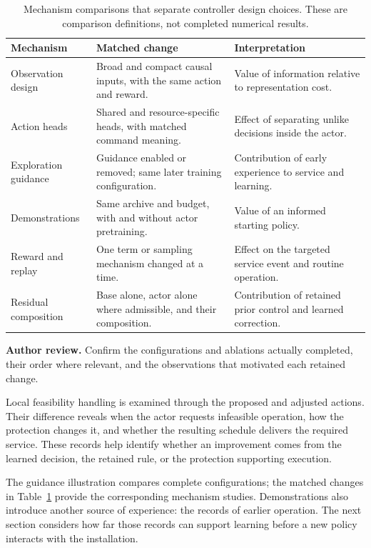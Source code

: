 \begin{table}[htbp]
\centering
\caption{Mechanism comparisons that separate controller design choices. These are comparison definitions, not completed numerical results.}
\label{tab:control-ablation-questions}
\small
\begin{tabularx}{\textwidth}{@{}p{}XX@{}}
\toprule
\textbf{Mechanism} & \textbf{Matched change} & \textbf{Interpretation}\\
\midrule
Observation design & Broad and compact causal inputs, with the same action and reward. & Value of information relative to representation cost.\\
\addlinespace
Action heads & Shared and resource-specific heads, with matched command meaning. & Effect of separating unlike decisions inside the actor.\\
\addlinespace
Exploration guidance & Guidance enabled or removed; same later training configuration. & Contribution of early experience to service and learning.\\
\addlinespace
Demonstrations & Same archive and budget, with and without actor pretraining. & Value of an informed starting policy.\\
\addlinespace
Reward and replay & One term or sampling mechanism changed at a time. & Effect on the targeted service event and routine operation.\\
\addlinespace
Residual composition & Base alone, actor alone where admissible, and their composition. & Contribution of retained prior control and learned correction.\\
\bottomrule
\end{tabularx}
\end{table}

\noindent\textcolor{orange!70!black}{\textbf{Author review.} Confirm the configurations and ablations actually completed, their order where relevant, and the observations that motivated each retained change.}

Local feasibility handling is examined through the proposed and adjusted actions. Their difference reveals when the actor requests infeasible operation, how the protection changes it, and whether the resulting schedule delivers the required service. These records help identify whether an improvement comes from the learned decision, the retained rule, or the protection supporting execution.

The guidance illustration compares complete configurations; the matched changes in Table~\ref{tab:control-ablation-questions} provide the corresponding mechanism studies. Demonstrations also introduce another source of experience: the records of earlier operation. The next section considers how far those records can support learning before a new policy interacts with the installation.


